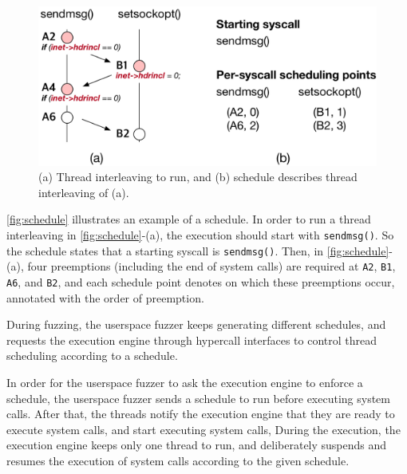 \begin{figure}[t]
  \centering
  \includegraphics[width=0.9\linewidth]{fig/schedule.pdf}
  \caption{(a) Thread interleaving to run, and (b) schedule describes
    thread interleaving of (a). }
  \label{fig:schedule}
\end{figure}

\autoref{fig:schedule} illustrates an example of a schedule. In order
to run a thread interleaving in \autoref{fig:schedule}-(a), the
execution should start with \texttt{sendmsg()}. So the schedule states
that a starting syscall is \texttt{sendmsg()}.
%
Then, in \autoref{fig:schedule}-(a), four preemptions (including the
end of system calls) are required at \texttt{A2}, \texttt{B1},
\texttt{A6}, and \texttt{B2}, and each schedule point denotes on which
these preemptions occur, annotated with the order of preemption.


During fuzzing, the userspace fuzzer keeps generating different
schedules, and requests the execution engine through hypercall
interfaces to control thread scheduling according to a schedule.





%
In order for the userspace fuzzer to ask the execution engine to
enforce a schedule, the userspace fuzzer sends a schedule to run
before executing system calls.
%
After that, the threads notify the execution engine that they are
ready to execute system calls, and start executing system calls,
%
During the execution, the execution engine keeps only one thread to
run, and deliberately suspends and resumes the execution of system
calls according to the given schedule.


